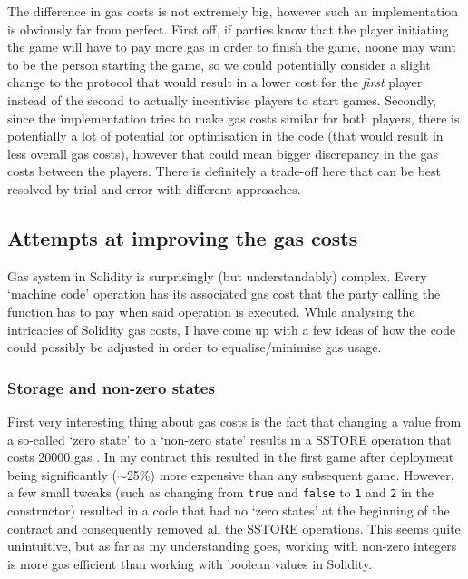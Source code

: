 \documentclass{article}
\begin{document}
    \noindent The difference in gas costs is not extremely
    big, however such an implementation is obviously far
    from perfect. First off, if parties know that the player
    initiating the game will have to pay more gas in order
    to finish the game, noone may want to be the person
    starting the game, so we could potentially consider a
    slight change to the protocol that would result in a
    lower cost for the {\itshape first} player instead of
    the second to actually incentivise players to start
    games. Secondly, since the implementation tries to make
    gas costs similar for both players, there is potentially
    a lot of potential for optimisation in the code (that
    would result in less overall gas costs), however that
    could mean bigger discrepancy in the gas costs between
    the players. There is definitely a trade-off here that
    can be best resolved by trial and error with different
    approaches.
    
    \subsection{Attempts at improving the gas costs}
    Gas system in Solidity is surprisingly (but
    understandably) complex. Every `machine code' operation
    has its associated gas cost that the party calling the
    function has to pay when said operation is executed.
    While analysing the intricacies of Solidity gas costs, I
    have come up with a few ideas of how the code could
    possibly be adjusted in order to equalise/minimise gas
    usage.

    \subsubsection{Storage and non-zero states}
    First very interesting thing about gas costs is the fact
    that changing a value from a so-called `zero state' to a
    `non-zero state' results in a SSTORE operation that
    costs 20000 gas \cite{ypaper}. In my contract this
    resulted in the first game after deployment being
    significantly (\(\sim\)25\%) more expensive than any
    subsequent game. However, a few small tweaks (such as
    changing from \verb|true| and \verb|false| to \verb|1|
    and \verb|2| in the constructor) resulted in a code that
    had no `zero states' at the beginning of the contract
    and consequently removed all the SSTORE operations. This
    seems quite unintuitive, but as far as my understanding
    goes, working with non-zero integers is more gas
    efficient than working with boolean values in Solidity.
    \newline
\end{document}
